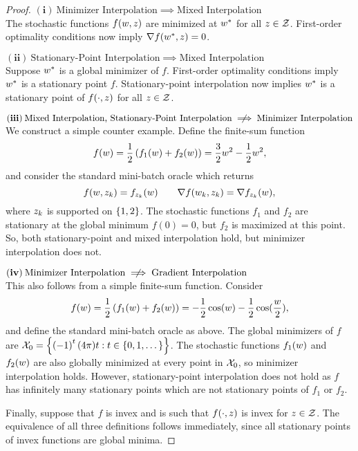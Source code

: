 \interpRelationships*
\begin{proof}\hfill \break
    \noindent \((\mathbf{i})\: \text{Minimizer Interpolation} \implies \text{Mixed Interpolation} \)\\
    The stochastic functions \( f(w, z) \) are minimized at \( w^* \) for all \( z \in \mathcal{Z} \).
    First-order optimality conditions now imply \( \nabla f(w^*, z) = 0 \).\hfill \break

\noindent    \( (\mathbf{ii}) \: \text{Stationary-Point Interpolation} \implies \text{Mixed Interpolation} \)\\
    Suppose \( w^* \) is a global minimizer of \( f \). 
    First-order optimality conditions imply \( w^* \) is a stationary point \( f \).
    Stationary-point interpolation now implies \( w^* \) is a stationary point of \( f(\cdot, z) \) for all \( z \in \mathcal{Z} \).\hfill \break

\noindent    \(  (\mathbf{iii}) \:\text{Mixed Interpolation, Stationary-Point Interpolation} \centernot \implies \text{Minimizer Interpolation} \)\\
    We construct a simple counter example.
    Define the finite-sum function
    \[ f(w) = \frac 1 2 \left(f_1(w) + f_2(w)\right) = \frac{3}{2}w^2 - \frac 1 2w^2, \]
    and consider the standard mini-batch oracle \oracle{} which returns
    \[ f(w, z_{k}) = f_{z_{k}}(w) \quad \quad \nabla f(w_k, z_{k}) = \nabla f_{z_{k}}(w), \] 
    where \( z_{k} \) is supported on \( \left\{1,2\right\} \).
    The stochastic functions \( f_1 \) and \( f_2 \) are stationary at the global minimum \( f(0) = 0 \), but \( f_2 \) is maximized at this point.
    So, both stationary-point and mixed interpolation hold, but minimizer interpolation does not.\hfill \break

\noindent    \( (\mathbf{iv}) \: \text{Minimizer Interpolation} \centernot \implies \text{Gradient Interpolation} \)\\
    This also follows from a simple finite-sum function.
    Consider
    \[ f(w) = \frac 1 2 \left(f_1(w) + f_2(w)\right) = -\frac 1 2 \cos(w) - \frac 1 2 \cos(\frac{w}{2}), \]
    and define the standard mini-batch oracle \oracle{} as above.
    The global minimizers of \( f \) are \(\mathcal{X}_0 = \left\{\left(-1\right)^{t} (4\pi) t : t \in \left\{0,1, \dots \right\}\right\} \).
    The stochastic functions \( f_1(w) \) and \( f_2(w) \) are also globally minimized at every point in \( \mathcal{X}_0 \), so minimizer interpolation holds.
    However, stationary-point interpolation does not hold as \( f \) has infinitely many stationary points which are not stationary points of \( f_1 \) or \( f_2 \). \hfill \break

    Finally, suppose that \( f \) is invex and \oracle{} is such that \( f(\cdot, z) \) is invex for \( z \in \mathcal{Z} \).
    The equivalence of all three definitions follows immediately, since all stationary points of invex functions are global minima.
\end{proof}

